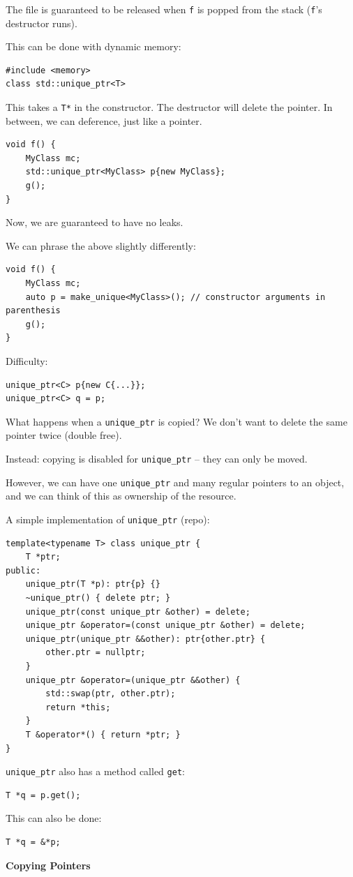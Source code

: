\documentclass[11pt]{article}
\theoremstyle{definition}
\begin{document}
The file is guaranteed to be released when {\tt f} is popped from the stack ({\tt f}'s destructor runs).

This can be done with dynamic memory:
\begin{lstlisting}
#include <memory>
class std::unique_ptr<T>
\end{lstlisting}
\vspace{-0.25cm}
This takes a {\tt T*} in the constructor. The destructor will delete the pointer. In between, we can deference, just like a pointer.
\begin{lstlisting}
void f() {
    MyClass mc;
    std::unique_ptr<MyClass> p{new MyClass};
    g();
}
\end{lstlisting}
\vspace{-0.25cm}
Now, we are guaranteed to have no leaks.

We can phrase the above slightly differently:
\begin{lstlisting}
void f() {
    MyClass mc;
    auto p = make_unique<MyClass>(); // constructor arguments in parenthesis
    g();
}
\end{lstlisting}
\vspace{-0.25cm}
Difficulty:
\begin{lstlisting}
unique_ptr<C> p{new C{...}};
unique_ptr<C> q = p;
\end{lstlisting}
\vspace{-0.25cm}
What happens when a {\tt unique\_ptr} is copied? We don't want to delete the same pointer twice (double free). 

Instead: copying is disabled for {\tt unique\_ptr} -- they can only be moved. 

However, we can have one {\tt unique\_ptr} and many regular pointers to an object, and we can think of this as ownership of the resource.

\newpage
A simple implementation of {\tt unique\_ptr} (repo):
\begin{lstlisting}
template<typename T> class unique_ptr {
    T *ptr;
public:
    unique_ptr(T *p): ptr{p} {}
    ~unique_ptr() { delete ptr; }
    unique_ptr(const unique_ptr &other) = delete;
    unique_ptr &operator=(const unique_ptr &other) = delete;
    unique_ptr(unique_ptr &&other): ptr{other.ptr} {
        other.ptr = nullptr;
    }
    unique_ptr &operator=(unique_ptr &&other) {
        std::swap(ptr, other.ptr);
        return *this;
    }
    T &operator*() { return *ptr; }
}
\end{lstlisting}
\vspace{-0.25cm}
{\tt unique\_ptr} also has a method called {\tt get}:
\begin{lstlisting}
T *q = p.get();
\end{lstlisting}
\vspace{-0.25cm}
This can also be done:
\begin{lstlisting}
T *q = &*p;
\end{lstlisting}
\vspace{-0.25cm}
{\bf Copying Pointers}
\end{document}

